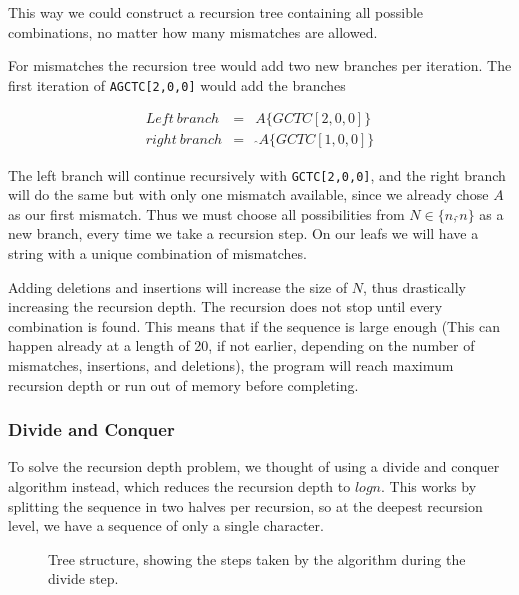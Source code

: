 \documentclass[12pt]{article}
\begin{document}
This way we could construct a recursion tree containing all possible combinations, no matter how many mismatches are allowed.

For mismatches the recursion tree would add two new branches per iteration. The first iteration of \texttt{AGCTC[2,0,0]} would add the branches

\begin{eqnarray}
	Left\ branch &=& A\{GCTC[2,0,0]\} \\
	right\ branch &=&\ \hat{}A\{GCTC[1,0,0]\}
\end{eqnarray}

The left branch will continue recursively with \texttt{GCTC[2,0,0]}, and the right branch will do the same but with only one mismatch available, since we already chose $A$ as our first mismatch. Thus we must choose all possibilities from $N \in \{n, \hat{}n\}$ as a new branch, every time we take a recursion step.
On our leafs we will have a string with a unique combination of mismatches.

Adding deletions and insertions will increase the size of $N$, thus drastically increasing the recursion depth. The recursion does not stop until every combination is found. This means that if the sequence is large enough (This can happen already at a length of 20, if not earlier, depending on the number of mismatches, insertions, and deletions), the program will reach maximum recursion depth or run out of memory before completing.

\subsubsection{Divide and Conquer}

To solve the recursion depth problem, we thought of using a divide and conquer algorithm instead, which reduces the recursion depth to $logn$. This works by splitting the sequence in two halves per recursion, so at the deepest recursion level, we have a sequence of only a single character.

\begin{figure}[H]
	\centering
	\caption{Tree structure, showing the steps taken by the algorithm during the divide step.}
	\label{fig:tree_example}
\end{figure}
\end{document}
